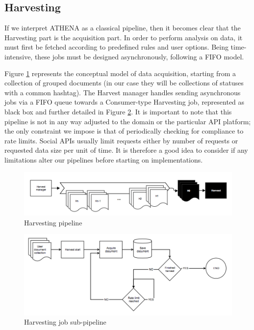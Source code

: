 \subsection{Harvesting}
If we interpret ATHENA as a classical pipeline, then it becomes clear that the Harvesting part is the acquisition part. In order to perform analysis on data, it must first be fetched according to predefined rules and user options. Being time-intensive, these jobs must be designed asynchronously, following a FIFO model.

Figure \ref{fig:harvestpipe1} represents the conceptual model of data acquisition, starting from a collection of grouped documents (in our case they will be collections of statuses with a common hashtag). The Harvest manager handles sending asynchronous jobs via a FIFO queue towards a Consumer-type Harvesting job, represented as black box and further detailed in Figure \ref{fig:harvestpipe}. It is important to note that this pipeline is not in any way adjusted to the domain or the particular API platform; the only constraint we impose is that of periodically checking for compliance to rate limits. Social APIs usually limit requests either by number of requests or requested data size per unit of time. It is therefore a good idea to consider if any limitations alter our pipelines before starting on implementations.

\begin{figure}[]
    \centering
\includegraphics[width=\columnwidth]{img/harvestpipe1.png}
    \caption{Harvesting pipeline}
    \label{fig:harvestpipe1}
\end{figure}

\begin{figure}[]
    \centering
\includegraphics[width=\columnwidth]{img/harvestpipe.png}
    \caption{Harvesting job sub-pipeline}
    \label{fig:harvestpipe}
\end{figure}

